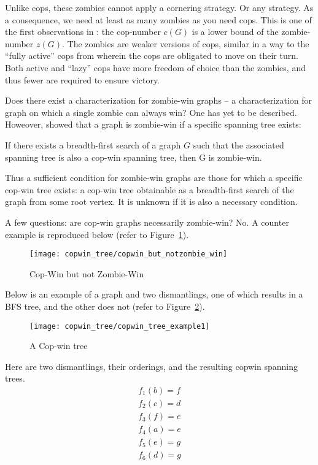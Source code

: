 Unlike cops, these zombies cannot apply a cornering strategy. Or any strategy.
As a consequence, we need at least as many zombies as you need cops.
This is one of the first observations
in \cite{fitzpatrick2016deterministic}: the cop-number $c(G)$ is a lower bound of the zombie-number $z(G)$. The zombies are weaker versions of cops, similar in a way to the ``fully active'' cops from \cite{gromovikov2018fully} wherein the cops are obligated to move on their turn. Both
active and ``lazy'' cops have more freedom of choice than the zombies, and thus
fewer are required to ensure victory.

Does there exist a characterization for zombie-win graphs -- a characterization for graph on which a single zombie can always win? One has yet to be described. Howeover, \cite{fitzpatrick2016deterministic} showed that a graph is zombie-win if a specific spanning tree exists:

\begin{theorem}[Fitzpatrick] If there exists a breadth-first search of a graph $G$ such that the associated spanning tree is also a cop-win spanning tree, then G is zombie-win.
\end{theorem}

Thus a sufficient condition for zombie-win graphs are those for which a specific cop-win tree exists: a cop-win tree obtainable as a breadth-first search of the graph from some root vertex. It is unknown if it is also a necessary condition.

A few questions: are cop-win graphs necessarily zombie-win? No. A counter example \cite{fitzpatrick2016deterministic} is reproduced below (refer to Figure~\ref{fig:copwin_but_notzombie_win}).

\begin{figure}
\centering
\texttt{[image: copwin\_tree/copwin\_but\_notzombie\_win]}
\caption{Cop-Win but not Zombie-Win \label{fig:copwin_but_notzombie_win}}
\end{figure}

Below is an example of a graph and two dismantlings, one of which results in a BFS tree, and the other does not (refer to Figure~\ref{fig:copwin_tree_example1}).

\begin{figure}
\centering
\texttt{[image: copwin\_tree/copwin\_tree\_example1]}
\caption{A Cop-win tree \label{fig:copwin_tree_example1}}
\end{figure}

Here are two dismantlings, their orderings, and the resulting copwin spanning trees.
\begin{align*}
  f_1(b) = f \\
  f_2(c) = d \\
  f_3(f) = e \\
  f_4(a) = e \\
  f_5(e) = g \\
  f_6(d) = g
\end{align*}


